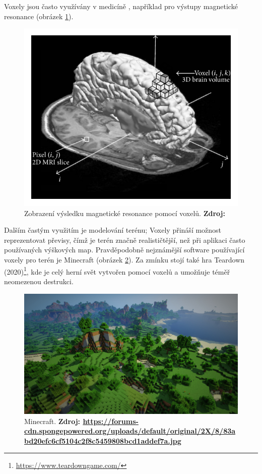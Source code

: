 Voxely jsou často využívány v medicíně \cite{medical_vox}, například pro výstupy magnetické resonance (obrázek \ref{fig:mri_vox}).

\begin{figure}[H]
	\centering
	\includegraphics[scale=1]{obrazky-figures/voxel_mri.png}
	\caption{Zobrazení výsledku magnetické resonance pomocí voxelů. \textbf{Zdroj: \cite{mri}}}
	\label{fig:mri_vox}
\end{figure}

Dalším častým využitím je modelování terénu; Voxely přináší možnost reprezentovat převisy, čímž je terén značně realističtější, než při aplikaci často používaných výškových map. Pravděpodobně nejznámější software používající voxely pro terén je Minecraft (obrázek \ref{fig:minecraft}). Za zmínku stojí také hra Teardown (2020)\footnote{\url{https://www.teardowngame.com/}}, kde je celý herní svět vytvořen pomocí voxelů a umožňuje téměř neomezenou destrukci.

\begin{figure}[H]
	\centering
	\includegraphics[scale=0.15]{obrazky-figures/minecraft.jpg}
	\caption{Minecraft. \textbf{Zdroj: \url{https://forums-cdn.spongepowered.org/uploads/default/original/2X/8/83abd20efc6cf5104c2f8c5459808bcd1addef7a.jpg}}}
	\label{fig:minecraft}
\end{figure}

